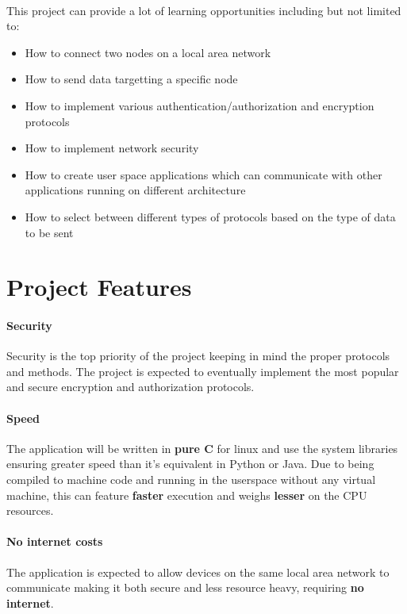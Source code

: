\documentclass[12pt, letterpaper, titlepage]{article}
\begin{document}
    \paragraph{}
    This project can provide a lot of learning opportunities including but not
    limited to:
    \begin{itemize}
        \item{How to connect two nodes on a local area network}
        \item{How to send data targetting a specific node}
        \item{How to implement various authentication/authorization and
            encryption protocols}
        \item{How to implement network security}
        \item{How to create user space applications which can communicate with
            other applications running on different architecture}
        \item{How to select between different types of protocols based on the
            type of data to be sent}
    \end{itemize}


\newpage
\section{Project Features}

    \paragraph{Security}
    Security is the top priority of the project keeping in mind the proper
    protocols and methods. The project is expected to eventually implement the
    most popular and secure encryption and authorization protocols.

    \paragraph{Speed}
    The application will be written in \textbf{pure C} for linux and use the
    system libraries ensuring greater speed than it's equivalent in Python or
    Java.  Due to being compiled to machine code and running in the userspace
    without any virtual machine, this can feature \textbf{faster} execution and
    weighs \textbf{lesser} on the CPU resources.

    \paragraph{No internet costs}
    The application is expected to allow devices on the same local area network
    to communicate making it both secure and less resource heavy, requiring
    \textbf{no internet}.
\end{document}
